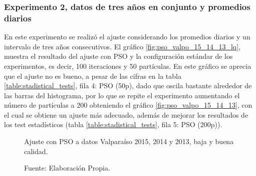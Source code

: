 \subsubsection{Experimento 2, datos de tres años en conjunto y promedios diarios}
En este experimento se realizó el ajuste considerando los promedios diarios y un intervalo de tres años consecutivos. El gráfico \ref{fig:pso_valpo_15_14_13_lq}, muestra el resultado del ajuste con PSO y la configuración estándar de los experimentos, es decir, 100 iteraciones y 50 partículas. En este gráfico se aprecia que el ajuste no es bueno, a pesar de las cifras en la tabla \ref{table:stadistical_tests}, fila 4: PSO (50p), dado que oscila bastante alrededor de las barras del histograma, por lo que se repite el experimento aumentando el número de partículas a 200 obteniendo el gráfico \ref{fig:pso_valpo_15_14_13}, con el cual se obtiene un ajuste más adecuado, además de mejorar los resultados de los test estadísticos (tabla \ref{table:stadistical_tests}, fila 5: PSO (200p)).\\
\begin{figure}[ht!]
    \centering
    \captionsetup{justification=centering,margin=2cm}
    \caption{Ajuste con PSO a datos Valparaíso 2015, 2014 y 2013, baja y buena calidad.}
    \caption*{Fuente: Elaboración Propia.}
    \label{fig:subfigures}
\end{figure}

